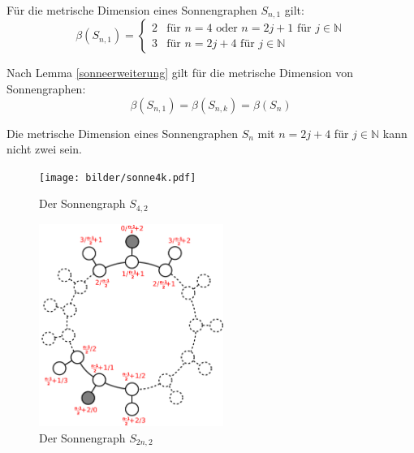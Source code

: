 \begin{lem}\cite{sun}
Für die metrische Dimension eines Sonnengraphen $S_{n,1}$ gilt:
\begin{equation}
   \beta(S_{n,1})=
   \begin{cases}
     2 & \text{f\"ur } n = 4 \text{ oder } n = 2j+1 \text{ f\"ur } j \in \mathbb{N} \\
     3 & \text{f\"ur } n = 2j+4 \text{ f\"ur } j \in \mathbb{N} 
   \end{cases}
\end{equation}
\end{lem}
\begin{bem}
Nach Lemma \ref{sonneerweiterung} gilt für die metrische Dimension von Sonnengraphen: $$\beta(S_{n,1})=\beta(S_{n,k})=\beta(S_n)$$
\end{bem}
\begin{lem}
Die metrische Dimension eines Sonnengraphen $S_{n}$ mit $n = 2j+4$ für $j \in \mathbb{N}$ kann nicht zwei sein. 
\end{lem}
\newpage
\begin{figure}[h!]
\begin{minipage}[hbt]{7cm}
	\centering
	\texttt{[image: bilder/sonne4k.pdf]}  
   \caption{Der Sonnengraph $S_{4,2}$}  
	\label{Bild1}
\end{minipage}
\hfill
\begin{minipage}[hbt]{7cm}
	\centering
	\includegraphics[width=170pt]{bilder/sonne2.pdf}
   \caption{Der Sonnengraph $S_{2n,2}$}
	\label{Bild2}
\end{minipage}
\end{figure}
\vspace{-7mm}

